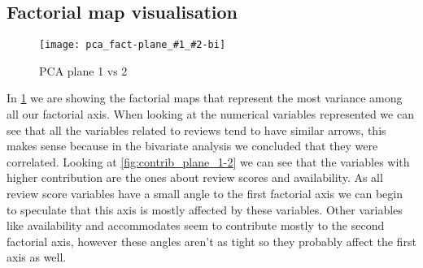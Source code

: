 \subsection{Factorial map visualisation}%
\label{sub:factorial_map_visualisation}

\newcommand{\factorialmap}[2]{
    \begin{landscape}
    \begin{figure}[H]
        \centering
        \texttt{[image: pca\_fact-plane\_\#1\_\#2-bi]}
        \caption{PCA plane #1 vs #2}%
        \label{fig:plane_#1-#2}
    \end{figure}
    \end{landscape}
}

\newcommand{\factvar}[2]{
    \begin{figure}[H]
        \centering
        \texttt{[image: pca\_fact-plane\_\#1\_\#2-var]}
        \caption{PCA plane #1 vs #2 (numerical)}%
        \label{fig:plane_#1-#2-var}
    \end{figure}
}

\newcommand{\factorialmapCV}[2]{
    \contrib{#1}{#2}
    \factvar{#1}{#2}
}

\newcommand{\contrib}[2]{
    \begin{figure}[H]
        \centering
        \texttt{[image: pca\_fact-plane\_\#1\_\#2-contrib]}
        \caption{PCA variable contributions of plane #1 vs #2}%
        \label{fig:contrib_plane_#1-#2}
    \end{figure}
}

\newcommand{\categorica}[4]{
    \begin{figure}[H]
        \centering
        \texttt{[image: pca\_fact-\#3-plane\_\#1\_\#2]}
        \caption{PCA variable contributions of #4 in plane #1 vs #2}%
        \label{fig:cat-#3-plane-#1-#2}
    \end{figure}
}


\factorialmap{1}{2}

In \cref{fig:plane_1-2} we are showing the factorial maps that represent the most variance among all our factorial axis. When looking at the numerical variables represented we can see that all the variables
related to reviews tend to have similar arrows, this makes sense 
because in the bivariate analysis we concluded that they were correlated.
Looking at \cref{fig:contrib_plane_1-2} we can see that the variables
with higher contribution are the ones about review scores and availability. As all review score variables have a small angle to the first factorial axis we can begin to speculate that this axis is 
mostly affected by these variables. Other variables like availability
and accommodates seem to contribute mostly to the second factorial axis, however these angles aren't as tight so they probably affect the first axis as well.

